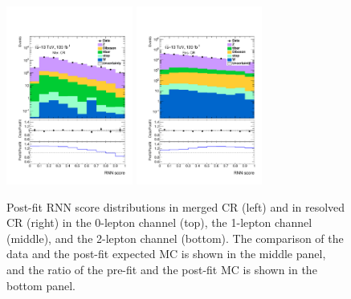 \begin{figure}[H]
    \includegraphics[width=0.37\textwidth]{figures/validation/Region_distRNNScoreMerged_DCRVjet_BMin0_J0_incJet1_L2_T0_incFat1_Y6051_incTag1_Fat1.pdf}
    \includegraphics[width=0.37\textwidth]{figures/validation/Region_distRNNScoreResolved_DCRVjetFid_BMin0_T0_Y6051_incTag1_J2_L2_incJet1.pdf}
    \caption{Post-fit RNN score distributions in merged CR (left) and in resolved CR (right) in the 0-lepton channel (top), the 1-lepton channel (middle), and the 2-lepton channel (bottom). The comparison of the data and the post-fit expected MC is shown in the middle panel, and the ratio of the pre-fit and the post-fit MC is shown in the bottom panel.}
    \label{fig:postCheck}
\end{figure}

